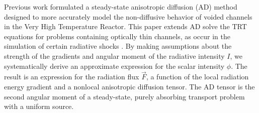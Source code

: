 \documentclass[11pt,letter,twoside]{mc2011}
\begin{document}
%

Previous work \cite{Lar2009c} formulated a steady-state anisotropic diffusion
(AD) method designed to more accurately model the non-diffusive behavior of
voided channels in the Very High Temperature Reactor.  This paper extends AD
solve the TRT equations for problems containing optically thin channels, as
occur in the simulation of certain radiative shocks \cite{Crash2010}.
By making assumptions about the strength of the gradients and
angular moment of the radiative intensity $I$, we systematically derive an
approximate expression for the scalar intensity $\phi$. The result is an
expression for the radiation flux $\vec{F}$, a function of the local radiation
energy
gradient and a nonlocal anisotropic diffusion tensor. The AD tensor is the
second angular moment of a steady-state, purely absorbing transport problem
with a uniform source.
\end{document}
